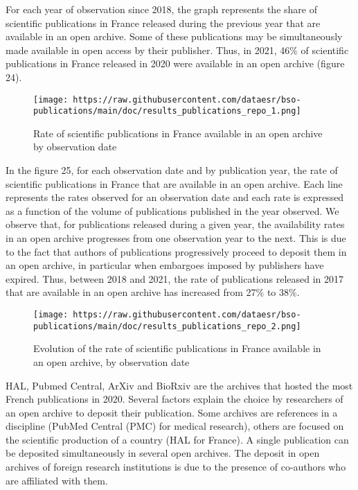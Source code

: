 \documentclass[
]{article}
\begin{document}
\newpage

For each year of observation since 2018, the graph represents the share
of scientific publications in France released during the previous year
that are available in an open archive. Some of these publications may be
simultaneously made available in open access by their publisher. Thus,
in 2021, 46\% of scientific publications in France released in 2020 were
available in an open archive (figure 24).

\begin{figure}
\centering
\texttt{[image: https://raw.githubusercontent.com/dataesr/bso-publications/main/doc/results\_publications\_repo\_1.png]}
\caption{Rate of scientific publications in France available in an open
archive by observation date}
\end{figure}

In the figure 25, for each observation date and by publication year, the
rate of scientific publications in France that are available in an open
archive. Each line represents the rates observed for an observation date
and each rate is expressed as a function of the volume of publications
published in the year observed. We observe that, for publications
released during a given year, the availability rates in an open archive
progresses from one observation year to the next. This is due to the
fact that authors of publications progressively proceed to deposit them
in an open archive, in particular when embargoes imposed by publishers
have expired. Thus, between 2018 and 2021, the rate of publications
released in 2017 that are available in an open archive has increased
from 27\% to 38\%.

\begin{figure}
\centering
\texttt{[image: https://raw.githubusercontent.com/dataesr/bso-publications/main/doc/results\_publications\_repo\_2.png]}
\caption{Evolution of the rate of scientific publications in France
available in an open archive, by observation date}
\end{figure}

HAL, Pubmed Central, ArXiv and BioRxiv are the archives that hosted the
most French publications in 2020. Several factors explain the choice by
researchers of an open archive to deposit their publication. Some
archives are references in a discipline (PubMed Central (PMC) for
medical research), others are focused on the scientific production of a
country (HAL for France). A single publication can be deposited
simultaneously in several open archives. The deposit in open archives of
foreign research institutions is due to the presence of co-authors who
are affiliated with them.
\end{document}
